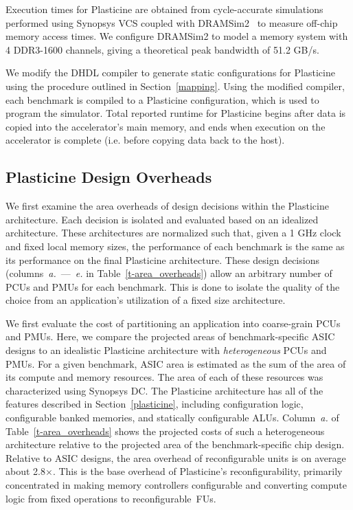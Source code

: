 Execution times for Plasticine are obtained from cycle-accurate simulations performed using Synopsys VCS coupled with DRAMSim2~\cite{dramsim2}
to measure off-chip memory access times. We configure DRAMSim2 to model a memory system with 4 DDR3-1600 channels, giving a theoretical peak
bandwidth of 51.2 GB/s.

We modify the DHDL compiler to generate static configurations for Plasticine using the procedure outlined in Section~\ref{mapping}.
Using the modified compiler, each benchmark is compiled to a Plasticine configuration, which is used to program the simulator.
Total reported runtime for Plasticine begins after data is copied into the accelerator's main memory,
and ends when execution on the accelerator is complete (i.e. before copying data back to the host).




\subsection{Plasticine Design Overheads}
We first examine the area overheads of design decisions within the Plasticine architecture.
Each decision is isolated and evaluated based on an idealized architecture. 
These architectures are normalized such that, given a 1 GHz clock and fixed local memory sizes, 
the performance of each benchmark is the same as its performance on the final Plasticine architecture.
These design decisions (columns~\emph{a.}~---~\emph{e.} in Table~\ref{t-area_overheads}) allow an arbitrary number of PCUs and PMUs for each benchmark.
This is done to isolate the quality of the choice from an application's utilization of a fixed size architecture.  

We first evaluate the cost of partitioning an application into coarse-grain PCUs and PMUs. 
Here, we compare the projected areas of benchmark-specific ASIC designs to an idealistic Plasticine architecture with \emph{heterogeneous} PCUs and PMUs.
For a given benchmark, ASIC area is estimated as the sum of the area of its compute and memory resources. The area of each of these resources was characterized using Synopsys DC.
The Plasticine architecture has all of the features described in Section~\ref{plasticine}, including configuration logic, configurable banked memories, and statically configurable ALUs.
Column~\emph{a.} of Table~\ref{t-area_overheads} shows the projected costs of such a heterogeneous architecture relative to the projected area of the benchmark-specific chip design. 
Relative to ASIC designs, the area overhead of reconfigurable units is on average about 2.8$\times$. This is the base overhead of Plasticine's reconfigurability, 
primarily concentrated in making memory controllers configurable and converting compute logic from fixed operations to reconfigurable~FUs.


